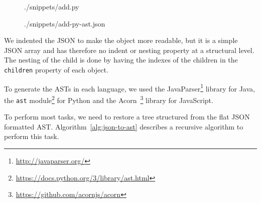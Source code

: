 \begin{figure}
  
    {./snippets/add.py}
\end{figure}

\begin{figure}
  
    {./snippets/add-py-ast.json}
\end{figure}

We indented the JSON to make the object more readable, but it is a simple JSON
array and has therefore no indent or nesting property at a structural level. The
nesting of the child is done by having the indexes of the children in the
\lstinline{children} property of each object.

To generate the ASTs in each language, we used the
JavaParser\footnote{\url{http://javaparser.org/}} library for Java, the
\lstinline{ast} module\footnote{\url{https://docs.python.org/3/library/ast.html}} for
Python and the Acorn~\footnote{\url{https://github.com/acornjs/acorn}} library for
JavaScript.

To perform most tasks, we need to restore a tree structured from the flat JSON
formatted AST. Algorithm~\ref{alg:json-to-ast} describes a recursive algorithm
to perform this task.

